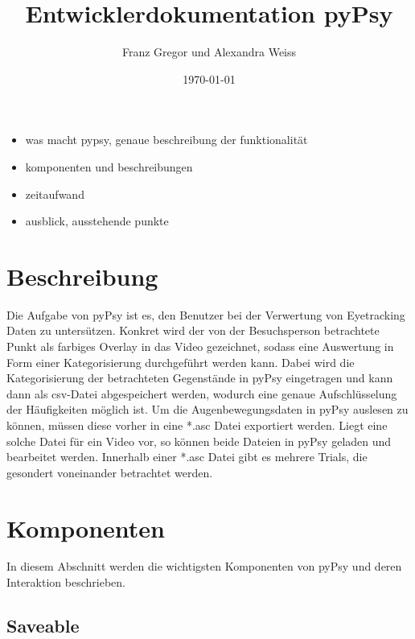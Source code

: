 \documentclass[a4paper,draft]{scrartcl}
\title{Entwicklerdokumentation pyPsy}
\author{Franz Gregor und Alexandra Weiss}
\date{\today}
\begin{document}
\maketitle
\newpage
\tableofcontents
\begin{itemize}
	\item was macht pypsy, genaue beschreibung der funktionalität
	\item komponenten und beschreibungen 
	\item zeitaufwand
	\item ausblick, ausstehende punkte
\end{itemize}
\newpage
\section{Beschreibung}
Die Aufgabe von pyPsy ist es, den Benutzer bei der Verwertung von Eyetracking Daten zu untersützen. Konkret wird der von der Besuchsperson betrachtete Punkt als farbiges Overlay in das Video gezeichnet, sodass eine Auswertung in Form einer Kategorisierung durchgeführt werden kann. Dabei wird die Kategorisierung der betrachteten Gegenstände in pyPsy eingetragen und kann dann als csv-Datei abgespeichert werden, wodurch eine genaue Aufschlüsselung der Häufigkeiten möglich ist. 
Um die Augenbewegungsdaten in pyPsy auslesen zu können, müssen diese vorher in eine *.asc Datei exportiert werden. Liegt eine solche Datei für ein Video vor, so können beide Dateien in pyPsy geladen und bearbeitet werden.
Innerhalb einer *.asc Datei gibt es mehrere Trials, die gesondert voneinander betrachtet werden.

\section{Komponenten}
In diesem Abschnitt werden die wichtigsten Komponenten von pyPsy und deren Interaktion beschrieben. 

\subsection{Saveable}
\end{document}
